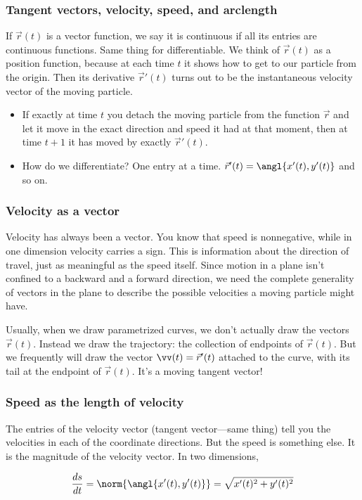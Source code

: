 \documentclass[11pt,ignorenonframetext,aspectratio=169,xcolor={svgnames}]{beamer}
\begin{document}
\begin{frame}\frametitle{Tangent vectors, velocity, speed, and
arclength}

If $\vec{r}(t)$ is a vector function, we say it is continuous if all its
entries are continuous functions. Same thing for differentiable. We
think of $\vec{r}(t)$ as a position function, because at each time $t$
it shows how to get to our particle from the origin. Then its derivative
$\vec{r}'(t)$ turns out to be the instantaneous velocity vector of the
moving particle.

\begin{itemize}[<+->]
\itemsep1pt\parskip0pt
\item
  If exactly at time $t$ you detach the moving particle from the
  function $\vec{r}$ and let it move in the exact direction and speed it
  had at that moment, then at time $t+1$ it has moved by exactly
  $\vec{r}'(t)$.
\item
  How do we differentiate? One entry at a time.
  $\vec{r}'(t) = \angl{x'(t), y'(t)}$ and so on.
\end{itemize}

\end{frame}

\begin{frame}\frametitle{Velocity as a vector}

Velocity has always been a vector. You know that speed is nonnegative,
while in one dimension velocity carries a sign. This is information
about the direction of travel, just as meaningful as the speed itself.
Since motion in a plane isn't confined to a backward and a forward
direction, we need the complete generality of vectors in the plane to
describe the possible velocities a moving particle might have.

Usually, when we draw parametrized curves, we don't actually draw the
vectors $\vec{r}(t)$. Instead we draw the trajectory: the collection of
endpoints of $\vec{r}(t)$. But we frequently will draw the vector
$\vv(t) = \vec{r}'(t)$ attached to the curve, with its tail at the
endpoint of $\vec{r}(t)$. It's a moving tangent vector!

\end{frame}

\begin{frame}\frametitle{Speed as the length of velocity}

The entries of the velocity vector (tangent vector---same thing) tell
you the velocities in each of the coordinate directions. But the speed
is something else. It is the magnitude of the velocity vector. In two
dimensions,

\begin{equation*}
    \frac{ds}{dt} = \norm{\angl{x'(t), y'(t)}} = \sqrt{x'(t)^2 + y'(t)^2}
\end{equation*}

\end{frame}
\end{document}
